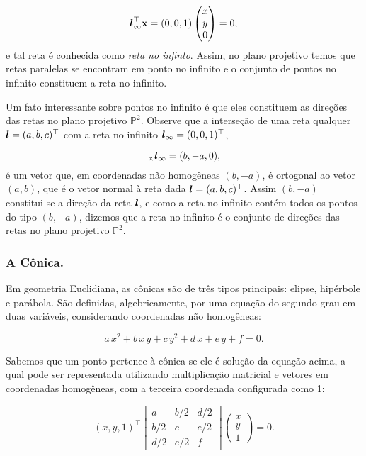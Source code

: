 \begin{equation*}
\boldsymbol{l}_\infty^\top \mathbf{x}=(0,0,1)
\begin{pmatrix}
x\\
y\\
0
\end{pmatrix}
=0,
\end{equation*} 
e tal reta é conhecida como \textit{reta no infinto}. Assim, no plano projetivo temos que retas paralelas se encontram em ponto no infinito e o conjunto de pontos no infinito constituem a reta no infinito.

Um fato interessante sobre pontos no infinito é que eles constituem as direções das retas no plano projetivo $\mathbb{P}^2$. Observe que a interseção de uma reta qualquer $\boldsymbol{l}=(a,b,c)^\top$ com a reta no infinito $\boldsymbol{l}_\infty=(0,0,1)^\top$,

\begin{equation*}
[\lightrgb]_\times \lightrgb_\infty=(b,-a,0),
\end{equation*}
é um vetor que, em coordenadas não homogêneas $(b,-a)$, é ortogonal ao vetor $(a,b)$, que é o vetor normal à reta dada $\boldsymbol{l}=(a,b,c)^\top$. Assim $(b,-a)$ constitui-se a direção da reta $\boldsymbol{l}$, e como a reta no infinito contém todos os pontos do tipo $(b,-a)$, dizemos que a reta no infinito é o conjunto de direções das retas no plano projetivo $\mathbb{P}^2$.\\





\subsubsection{A Cônica.}


Em geometria Euclidiana, as cônicas são de três tipos principais: elipse, hipérbole e parábola. São definidas, algebricamente, por uma equação do segundo grau em duas variáveis, considerando coordenadas não homogêneas:

\begin{equation*}
a\,x^2+b\,x\,y+c\,y^2+d\,x+e\,y+f=0.
\end{equation*}

Sabemos que um ponto pertence à cônica se ele é solução da equação acima, a qual pode ser representada utilizando multiplicação matricial e vetores em coordenadas homogêneas, com a terceira coordenada configurada como 1:

\begin{equation*}
(x,y,1)^\top 
 \begin{bmatrix}
a & b/2 & d/2\\
b/2 & c & e/2\\
d/2 & e/2 & f
\end{bmatrix}
 \begin{pmatrix}
x\\
y\\
1
\end{pmatrix}
 = 0.
\end{equation*}


